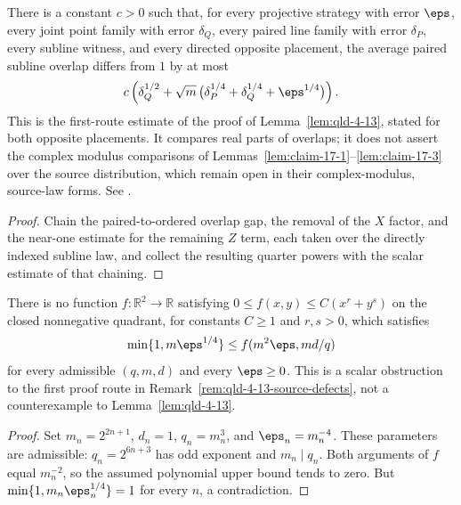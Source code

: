 \begin{lemma}
	\label{lem:subline-joint-overlap}
	\leanok
	There is a constant $c>0$ such that, for every projective strategy with
	error $\eps$, every joint point family with error $\delta_Q$, every paired
	line family with error $\delta_P$, every subline witness, and every directed
	opposite placement, the average paired subline overlap differs from $1$ by at
	most
	\[
		c\left(\delta_Q^{1/2}+\sqrt{m}\,
			\bigl(\delta_P^{1/4}+\delta_Q^{1/4}+\eps^{1/4}\bigr)\right).
	\]
	This is the first-route estimate of the proof of
	Lemma~\ref{lem:qld-4-13}, stated for both opposite placements. It compares
	real parts of overlaps; it does not assert the complex modulus comparisons of
	Lemmas~\ref{lem:claim-17-1}--\ref{lem:claim-17-3} over the source
	distribution, which remain open in their complex-modulus, source-law forms. See
	\cite{gap:qpbt_combined-lines-error-term}.
\end{lemma}
\begin{proof}
	\leanok
	Chain the paired-to-ordered overlap gap, the removal of the $X$ factor, and
	the near-one estimate for the remaining $Z$ term, each taken over the
	directly indexed subline law, and collect the resulting quarter powers with
	the scalar estimate of that chaining.
\end{proof}

\begin{lemma}
	\label{lem:qld-combining-quarter-power-obstruction}
	\leanok
	There is no function $f:\mathbb R^2\to\mathbb R$ satisfying
	$0\leq f(x,y)\leq C(x^r+y^s)$ on the closed nonnegative quadrant,
	for constants $C\geq 1$ and
	$r,s>0$, which satisfies
	\[
		\min\{1,m\eps^{1/4}\}\leq f(m^2\eps,md/q)
	\]
	for every admissible $(q,m,d)$ and every $\eps\geq0$.
	This is a scalar obstruction to the first proof route in
	Remark~\ref{rem:qld-4-13-source-defects}, not a counterexample to
	Lemma~\ref{lem:qld-4-13}.
\end{lemma}
\begin{proof}
	\leanok
	Set $m_n=2^{2n+1}$, $d_n=1$, $q_n=m_n^3$, and $\eps_n=m_n^{-4}$.
	These parameters are admissible: $q_n=2^{6n+3}$ has odd exponent and
	$m_n\mid q_n$. Both arguments of $f$ equal $m_n^{-2}$, so the assumed
	polynomial upper bound tends to zero. But
	$\min\{1,m_n\eps_n^{1/4}\}=1$ for every $n$, a contradiction.
\end{proof}

